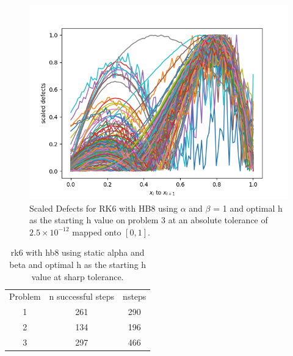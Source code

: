 \begin{figure}[H]
\centering
\includegraphics[width=0.7\linewidth]{./figures/sharp_tolerance_rk6_with_hb8_p3_scaled_defects}
\caption{Scaled Defects for RK6 with HB8 using $\alpha$ and $\beta$ = 1 and optimal h as the starting h value on problem 3 at an absolute tolerance of $2.5 \times 10^{-12}$ mapped onto $[0, 1]$.}
\label{fig:sharp_tolerance_rk6_with_hb8_p3_scaled_defects}
\end{figure}

\begin{table}[h]
\caption {rk6 with hb8 using static alpha and beta and optimal h as the starting h value at sharp tolerance.} \label{tab:rk6_with_hb8_sharp_tolerance}
\begin{center}
\begin{tabular}{ c c c } 
Problem & n successful steps      &       nsteps    \\ 
1       & 261                     &        290      \\ 
2       & 134                     &        196      \\
3       & 297                     &        466      \\
\end{tabular}
\end{center}
\end{table}	
